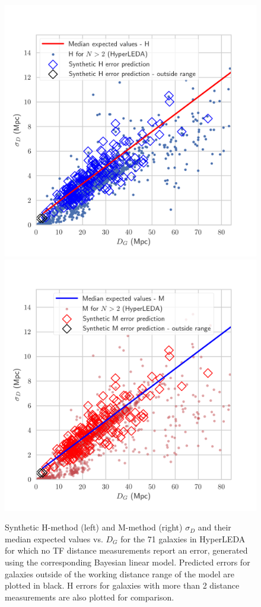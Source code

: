 \documentclass[a4paper,fleqn,usenatbib]{mnras}
\begin{document}
\begin{figure}
	\includegraphics[scale=0.69]{f24predhl1.png}
	\includegraphics[scale=0.69]{f25predhl2.png}
    \caption{Synthetic H-method (left) and M-method (right) $\sigma_D$ and their median expected values vs. $D_G$ for the 71 galaxies in HyperLEDA for which no TF distance measurements report an error, generated using the corresponding Bayesian linear model. Predicted errors for galaxies outside of the working distance range of the model are plotted in black. H errors for galaxies with more than 2 distance measurements are also plotted for comparison.}
    \label{fig:predhl1}
\end{figure}
\end{document}
